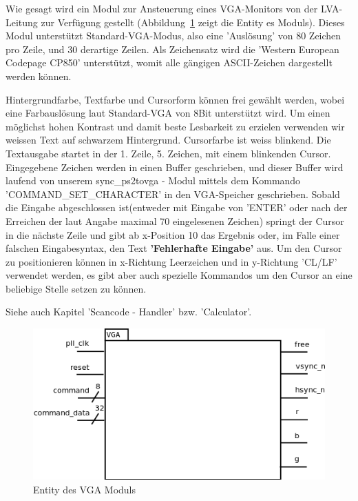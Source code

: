 Wie gesagt wird ein Modul zur Ansteuerung eines VGA-Monitors von der LVA-Leitung zur Verfügung gestellt (Abbildung~\ref{fig:entity_vga} zeigt die Entity es Moduls). Dieses Modul unterstützt Standard-VGA-Modus, also eine 'Auslösung' von 80 Zeichen pro Zeile, und 30 derartige Zeilen. Als Zeichensatz wird die 'Western European Codepage CP850' unterstützt, womit alle gängigen ASCII-Zeichen dargestellt werden können.

Hintergrundfarbe, Textfarbe und Cursorform können frei gewählt werden, wobei eine Farbauslösung laut Standard-VGA von 8Bit unterstützt wird. Um einen möglichst hohen Kontrast und damit beste Lesbarkeit zu erzielen verwenden wir weissen Text auf schwarzem Hintergrund. Cursorfarbe ist weiss blinkend.
Die Textausgabe startet in der 1. Zeile, 5. Zeichen, mit einem blinkenden Cursor. Eingegebene Zeichen werden in einen Buffer geschrieben, und dieser Buffer wird laufend von unserem sync\_ps2tovga - Modul mittels dem Kommando 'COMMAND\_SET\_CHARACTER' in den VGA-Speicher geschrieben. Sobald die Eingabe abgeschlossen 	ist(entweder mit Eingabe von 'ENTER' oder nach der Erreichen der laut Angabe maximal 70 eingelesenen Zeichen) springt der Cursor in die nächste Zeile und gibt ab x-Position 10 das Ergebnis oder, im Falle einer falschen Eingabesyntax, den Text \textbf{'Fehlerhafte Eingabe'} aus. Um den Cursor zu positionieren können in x-Richtung Leerzeichen und in y-Richtung 'CL/LF' verwendet werden, es gibt aber auch spezielle Kommandos um den Cursor an eine beliebige Stelle setzen zu können.

Siehe auch Kapitel 'Scancode - Handler' bzw. 'Calculator'.

\begin{figure}[!ht]
	\centering
	\includegraphics[scale=0.3]{figures/entity_vga.png} 
	\caption{Entity des VGA Moduls}
	\label{fig:entity_vga}
\end{figure}

